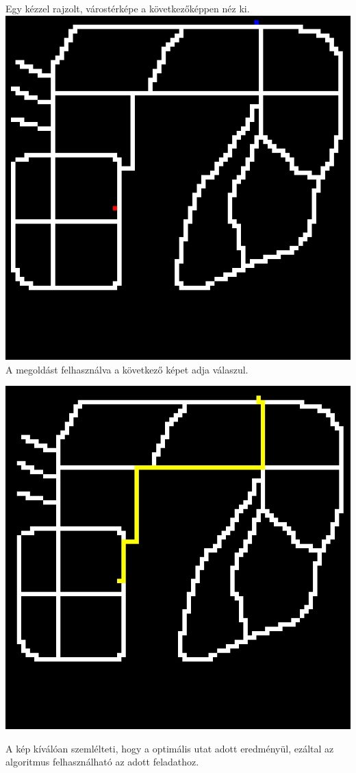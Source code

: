 

Egy kézzel rajzolt, várostérképe a következőképpen néz ki.
\\
\includegraphics[scale=0.8]{images/AStarProblem.jpg}
\\
A megoldást felhasználva a következő képet adja válaszul.

\includegraphics[scale=0.8]{images/AStarResult.jpg}

A kép kíválóan szemlélteti, hogy a optimális utat adott eredményül, ezáltal az algoritmus felhasználható az adott feladathoz.

